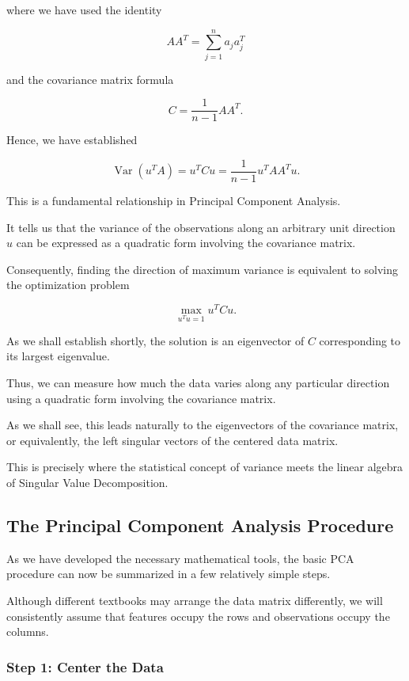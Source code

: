 \documentclass[11pt]{article}
\begin{document}
where we have used the identity

\[
AA^T=\sum_{j=1}^{n}a_ja_j^T
\]

and the covariance matrix formula

\[
C=\frac{1}{n-1}AA^T.
\]

Hence, we have established

\[
\boxed{
\operatorname{Var}(u^TA)
=
u^TCu
=
\frac{1}{n-1}u^TAA^Tu.
}
\]

This is a fundamental relationship
in Principal Component Analysis.

It tells us that the variance of
the observations along an arbitrary
unit direction $u$ can be expressed
as a quadratic form involving
the covariance matrix.

Consequently, finding the direction
of maximum variance is equivalent
to solving the optimization problem

\[
\boxed{
\max_{u^Tu=1}u^TCu.
}
\]

As we shall establish shortly,
the solution is an eigenvector
of $C$ corresponding to its
largest eigenvalue.




Thus, we can measure how much
the data varies along any
particular direction using
a quadratic form involving
the covariance matrix.



As we shall see, this leads
naturally to the eigenvectors
of the covariance matrix,
or equivalently, the left
singular vectors of the
centered data matrix.

This is precisely where
the statistical concept
of variance meets the
linear algebra of Singular
Value Decomposition.


\subsection{The Principal Component Analysis
Procedure}

As we have developed the necessary mathematical tools, the basic PCA procedure can now be summarized
in a few relatively simple steps.

Although different textbooks may arrange
the data matrix differently, we will
consistently assume that features occupy
the rows and observations occupy the
columns.

\subsubsection*{Step 1: Center the Data}
\end{document}
